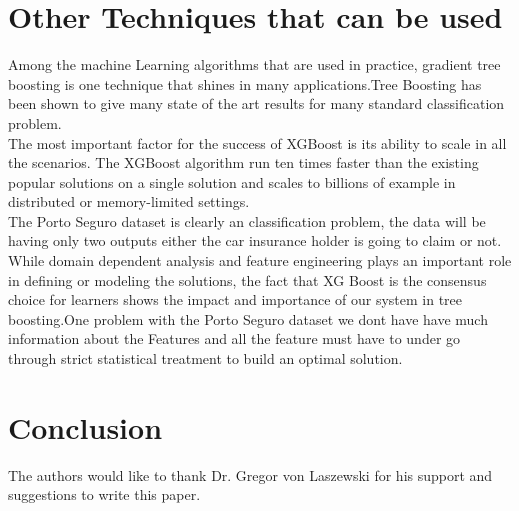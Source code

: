 \section{Other Techniques that can be used}
Among the machine Learning algorithms that are used in practice, gradient tree boosting is one technique that shines in many applications.Tree Boosting has been shown to give many state of the art results for many standard classification problem.
\\
The most important factor for the success of XGBoost is its ability to scale in all the scenarios. The XGBoost algorithm run ten times faster than the existing popular solutions on a single solution and scales to billions of example in distributed or memory-limited settings.
\\
The Porto Seguro dataset is clearly an classification problem, the data will be having only two outputs either the car insurance holder is going to claim or not.
\\
While domain dependent analysis and feature engineering plays an important role in defining or modeling the solutions, the fact that XG Boost is the consensus choice for learners shows the impact and importance  of our system in tree boosting.One problem with the Porto Seguro dataset we dont have have much information about the Features and all the feature must have to under go through strict statistical treatment to build an optimal solution.

\section{Conclusion}


\begin{acks}

  The authors would like to thank Dr. Gregor von Laszewski for his
  support and suggestions to write this paper.

\end{acks}


 
